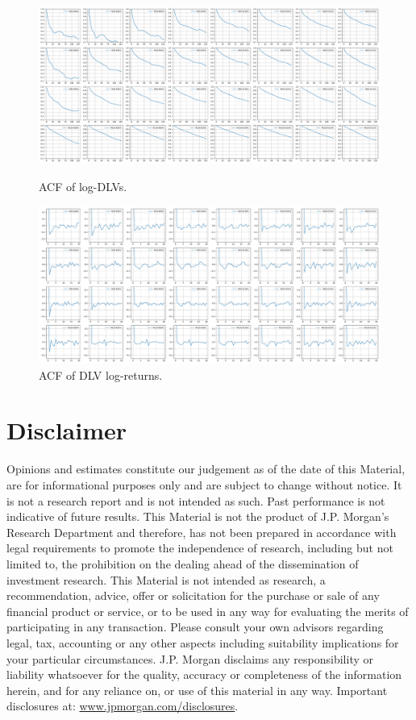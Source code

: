 \documentclass[]{article} %
\begin{document}
\begin{figure}[!htb]
 \centering
    \begin{minipage}{.45\textwidth}
        \centering
        \includegraphics[width=\textwidth]{figures/dlvs/acf.pdf}
        \caption{ACF of log-DLVs.}
        \label{fig:acf_DLVs}
    \end{minipage}%
	\hfill
    \begin{minipage}{.45\textwidth}
         \centering
        \includegraphics[width=\textwidth]{figures/dlvs/acf_diff.pdf}
        \caption{ACF of DLV log-returns.}
        \label{fig:acf_DLV_logrtns}
    \end{minipage}
\end{figure}
\newpage
\section{Disclaimer}
Opinions and estimates constitute our judgement as of the date of this Material, are for informational purposes only and are subject to change without notice. It is not a research report and is not intended as such. Past performance is not indicative of future results. This Material is not the product of J.P. Morgan's Research Department and therefore, has not been prepared in accordance with legal requirements to promote the independence of research, including but not limited to, the prohibition on the dealing ahead of the dissemination of investment research. This Material is not intended as research, a recommendation, advice, offer or solicitation for the purchase or sale of any financial product or service, or to be used in any way for evaluating the merits of participating in any transaction. Please consult your own advisors regarding legal, tax, accounting or any other aspects including suitability implications for your particular circumstances.  J.P. Morgan disclaims any responsibility or liability whatsoever for the quality, accuracy or completeness of the information herein, and for any reliance on, or use of this material in any way.  Important disclosures at: \url{www.jpmorgan.com/disclosures}.
\end{document}
